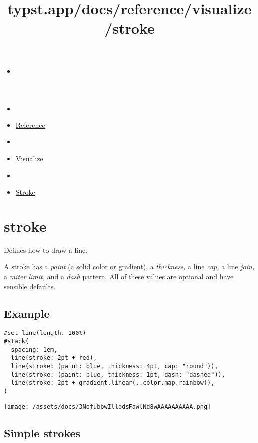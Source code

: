 \title{typst.app/docs/reference/visualize/stroke}

\begin{itemize}
\tightlist
\item
  \href{/docs}{}
\item
  
\item
  \href{/docs/reference/}{Reference}
\item
  
\item
  \href{/docs/reference/visualize/}{Visualize}
\item
  
\item
  \href{/docs/reference/visualize/stroke/}{Stroke}
\end{itemize}

\section{\texorpdfstring{{ stroke }}{ stroke }}\label{summary}

Defines how to draw a line.

A stroke has a \emph{paint} (a solid color or gradient), a
\emph{thickness,} a line \emph{cap,} a line \emph{join,} a \emph{miter
limit,} and a \emph{dash} pattern. All of these values are optional and
have sensible defaults.

\subsection{Example}\label{example}

\begin{verbatim}
#set line(length: 100%)
#stack(
  spacing: 1em,
  line(stroke: 2pt + red),
  line(stroke: (paint: blue, thickness: 4pt, cap: "round")),
  line(stroke: (paint: blue, thickness: 1pt, dash: "dashed")),
  line(stroke: 2pt + gradient.linear(..color.map.rainbow)),
)
\end{verbatim}

\texttt{[image: /assets/docs/3NofubbwIllodsFawlNd8wAAAAAAAAAA.png]}

\subsection{Simple strokes}\label{simple-strokes}

